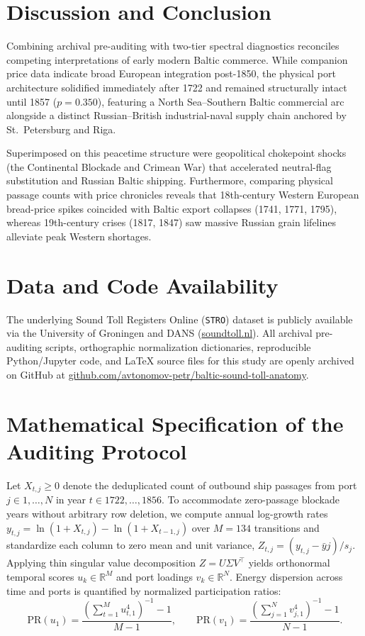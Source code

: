 \documentclass[11pt,a4paper]{article}
\begin{document}
\section{Discussion and Conclusion}

Combining archival pre-auditing with two-tier spectral diagnostics reconciles competing interpretations of early modern Baltic commerce. While companion price data indicate broad European integration post-1850, the physical port architecture solidified immediately after 1722 and remained structurally intact until 1857 ($p = 0.350$), featuring a North Sea–Southern Baltic commercial arc alongside a distinct Russian--British industrial-naval supply chain anchored by St.~Petersburg and Riga. 

Superimposed on this peacetime structure were geopolitical chokepoint shocks (the Continental Blockade and Crimean War) that accelerated neutral-flag substitution and Russian Baltic shipping. Furthermore, comparing physical passage counts with price chronicles reveals that 18th-century Western European bread-price spikes coincided with Baltic export collapses (1741, 1771, 1795), whereas 19th-century crises (1817, 1847) saw massive Russian grain lifelines alleviate peak Western shortages.

\section*{Data and Code Availability}
The underlying Sound Toll Registers Online (\texttt{STRO}) dataset is publicly available via the University of Groningen and DANS (\url{soundtoll.nl}). All archival pre-auditing scripts, orthographic normalization dictionaries, reproducible Python/Jupyter code, and LaTeX source files for this study are openly archived on GitHub at \url{github.com/avtonomov-petr/baltic-sound-toll-anatomy}.
\appendix
\section{Mathematical Specification of the Auditing Protocol}
Let $X_{t,j} \ge 0$ denote the deduplicated count of outbound ship passages from port $j \in {1,\dots,N}$ in year $t \in {1722,\dots,1856}$. To accommodate zero-passage blockade years without arbitrary row deletion, we compute annual log-growth rates $y_{t,j} = \ln(1 + X_{t,j}) - \ln(1 + X_{t-1,j})$ over $M = 134$ transitions and standardize each column to zero mean and unit variance, $Z_{t,j} = (y_{t,j} - \bar{y}j)/s_j$. Applying thin singular value decomposition $Z = U \Sigma V^\top$ yields orthonormal temporal scores $u_k \in \mathbb{R}^M$ and port loadings $v_k \in \mathbb{R}^N$. Energy dispersion across time and ports is quantified by normalized participation ratios:
\begin{equation}
\mathrm{PR}(u_1) = \frac{\left(\sum_{t=1}^M u_{t,1}^4\right)^{-1} - 1}{M - 1} , \qquad
\mathrm{PR}(v_1) = \frac{\left(\sum_{j=1}^N v_{j,1}^4\right)^{-1} - 1}{N - 1} .
\end{equation}
\end{document}
